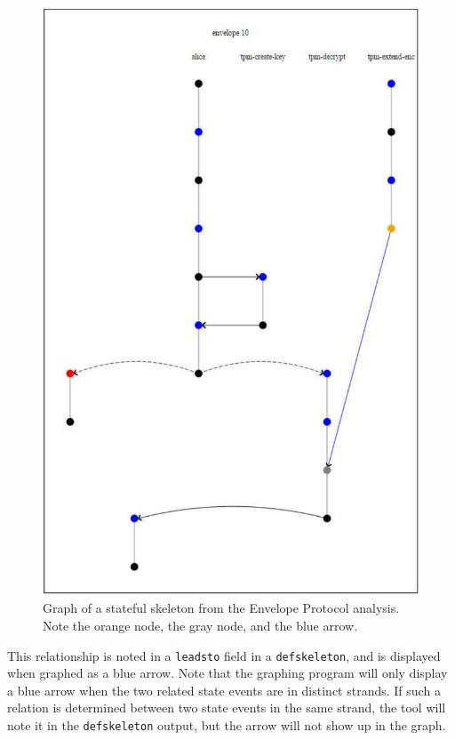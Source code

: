 \begin{figure}
\centering
\includegraphics[scale=0.7]{envelope_skel10}
\caption[Graph of a stateful skeleton]{Graph of a stateful skeleton from the Envelope Protocol analysis.  Note the orange node, the gray node, and the blue arrow.}
\label{fig:envelope skel10}
\end{figure}

 This relationship is noted in a \texttt{leadsto}
field in a \texttt{defskeleton}, and is displayed when graphed as
a blue arrow.  Note that the graphing program will only display a
blue arrow when the two related state events are in distinct strands.
If such a relation is determined between two state events in the same
strand, the tool will note it in the \texttt{defskeleton} output, but
the arrow will not show up in the graph.

